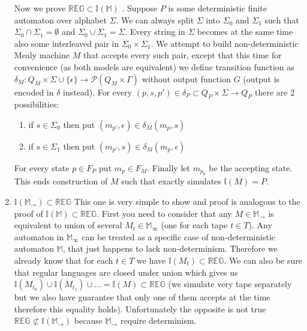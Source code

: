 \documentclass[12pt]{article}
\begin{document}
\begin{enumerate}
 Now we prove $\mathbb{REG} \subset \mathbb{I}(\mathbb{M})$ . Suppose $P$ is some deterministic finite automaton over alphabet $\Sigma$. We can always split $\Sigma$ into $\Sigma_0$ and $\Sigma_1$ such that $\Sigma_0 \cap \Sigma_1 = \emptyset$ and $\Sigma_0 \cup \Sigma_1 = \Sigma$. Every string in $\Sigma$ becomes at the same time also some interleaved pair in $\Sigma_0 \times \Sigma_1$. We attempt to build non-deterministic Mealy machine $M$ that accepts every such pair, except that this time for convenience (as both models are equivalent) we define transition function as $\delta_M : Q_M \times \Sigma \cup \{\epsilon\} \rightarrow \mathcal{P}(Q_M \times \Gamma)$ without output function $G$ (output is encoded in $\delta$ instead).  For every $(p,s,p') \in \delta_P \subset Q_P \times \Sigma \rightarrow Q_P$ there are 2 possibilities: 
\begin{enumerate}
	\item if $s \in \Sigma_0$ then put $(m_{p'},\epsilon) \in \delta_M(m_p,s) $ 
	\item if $s \in \Sigma_1$ then put $(m_{p'},s) \in \delta_M(m_p,\epsilon) $ 
\end{enumerate}
For every state $p \in F_P$ put $m_p \in F_M$. Finally let $m_{p_0}$ be the accepting state. This ends construction of $M$ such that exactly simulates $\mathbb{I}(M) = P$.

\item $\mathbb{I}(\mathbb{M}_\rightarrow) \subset \mathbb{REG}$ This one is very simple to show and proof is analogous to the proof of $\mathbb{I}(\mathbb{M}) \subset \mathbb{REG}$. First you need to consider that any $M \in \mathbb{M}_\rightarrow$ is equivalent to union of several $M_t \in\mathbb{M}_\infty$ (one for each tape $t \in T$). Any automaton in $\mathbb{M}_\infty$ can be treated as a specific case of non-deterministic automaton $\mathbb{M}$, that just happens to lack non-determinism. Therefore we already know that for each $t\in T$ we have $\mathbb{I}(M_t) \subset \mathbb{REG}$. We can also be sure that regular languages are closed under union which gives us $\mathbb{I}(M_{t_0}) \cup \mathbb{I}(M_{t_1}) \cup ... = \mathbb{I}(M) \subset \mathbb{REG}$ (we simulate very tape separately but we also have guarantee that only one of them accepts at the time therefore this equality holds). Unfortunately the opposite is not true $\mathbb{REG} \not\subset \mathbb{I}(\mathbb{M}_\rightarrow) $ because $\mathbb{M}_\rightarrow$ require determinism.



 \end{enumerate}
\end{document}
